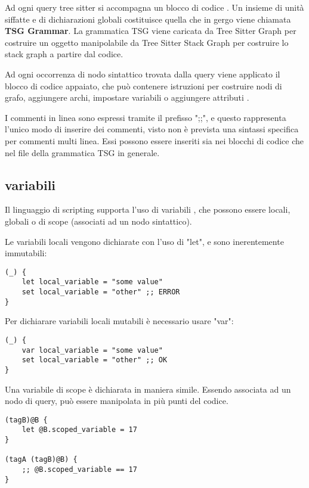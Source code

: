 Ad ogni query tree sitter si accompagna un blocco di codice \cite{TreeSitterGraphReferenceHighLevelStructure}.
Un insieme di unit\`a siffatte e di dichiarazioni globali costituisce quella che in gergo viene chiamata \textbf{TSG Grammar}.
La grammatica TSG viene caricata da Tree Sitter Graph per costruire un oggetto manipolabile da Tree Sitter Stack Graph per costruire lo stack graph a partire dal codice.

Ad ogni occorrenza di nodo sintattico trovata dalla query viene applicato il blocco di codice appaiato, che pu\`o contenere istruzioni per costruire nodi di grafo, aggiungere archi, impostare variabili o aggiungere attributi \cite{TreeSitterGraphReferenceTerminology}.

I commenti in linea sono espressi tramite il prefisso ";;", e questo rappresenta l'unico modo di inserire dei commenti, visto non \`e prevista una sintassi specifica per commenti multi linea.
Essi possono essere inseriti sia nei blocchi di codice che nel file della grammatica TSG in generale.

\subsection{variabili}
Il linguaggio di scripting supporta l'uso di variabili \cite{TreeSitterGraphReferenceVariables}, che possono essere locali, globali o di scope (associati ad un nodo sintattico).

Le variabili locali vengono dichiarate con l'uso di "let", e sono inerentemente immutabili:

\begin{lstlisting}
(_) {
    let local_variable = "some value"
    set local_variable = "other" ;; ERROR
}
\end{lstlisting}

Per dichiarare variabili locali mutabili \`e necessario usare "var":

\begin{lstlisting}
(_) {
    var local_variable = "some value"
    set local_variable = "other" ;; OK
}
\end{lstlisting}

Una variabile di scope \`e dichiarata in maniera simile. Essendo associata ad un nodo di query, pu\`o essere manipolata in pi\`u punti del codice.

\begin{lstlisting}
(tagB)@B {
    let @B.scoped_variable = 17
}

(tagA (tagB)@B) {
    ;; @B.scoped_variable == 17
}
\end{lstlisting}


